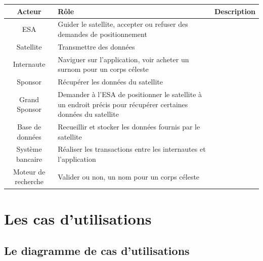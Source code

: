 \documentclass[11pt,a4paper]{article}
\begin{document}
\begin{tabularx}{\linewidth}{|c|X|}
    \hline
    \textbf{Acteur} & \textbf{R\^ole} & \textbf{Description} \\
    \hline
    
    ESA & Guider le satellite, accepter ou refuser des demandes de
    positionnement\\
    
    \hline
    
    Satellite & Transmettre des donn\'ees \\
    
    \hline
    
    Internaute & Naviguer sur l'application, voir acheter un
    surnom pour un corps c\'eleste \\
    
    \hline
    
    Sponsor & R\'ecup\'erer les donn\'ees du satellite \\
    
    \hline
    
    Grand Sponsor & Demander \`a l'ESA de positionner le satellite
    \`a un endroit pr\'ecis pour r\'ecup\'erer certaines donn\'ees du
    satellite \\
    
    \hline
    
    Base de donn\'ees & Recueillir et stocker les donn\'ees fournis
    par le satellite \\
    
    \hline
    
    Syst\`eme bancaire & R\'ealiser les transactions entre les
    internautes et l'application \\
    
    \hline
    
    Moteur de recherche & Valider ou non, un nom pour un corps 
    c\'eleste \\
    \hline

\end{tabularx}



\newpage


\section{Les cas d’utilisations}

\subsection{Le diagramme de cas d’utilisations}
\end{document}
